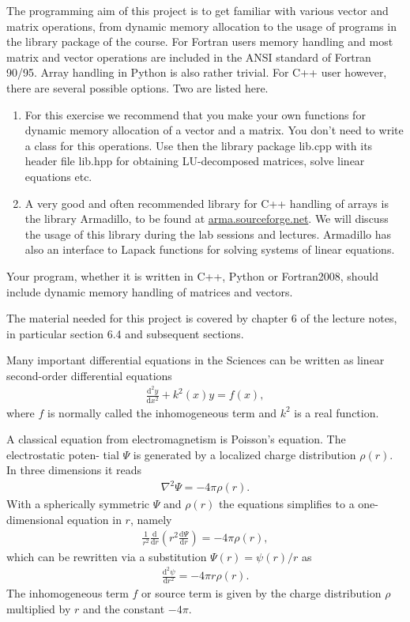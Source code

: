 \documentclass[11pt,a4wide]{article}
\newcommand{\der} [2]{\frac{\mathrm{d} #1}{\mathrm{d} #2}}   %
\begin{document}
The programming aim of this project is to get familiar with various vector and matrix operations,
from dynamic memory allocation to the usage of programs in the library
package of the course. 
For Fortran users memory handling and most matrix and vector operations
are included in the ANSI standard of Fortran 90/95. Array handling in Python is also rather trivial. For C++ user however,
there are several possible options. Two are listed here.
\begin{enumerate}
\item For this exercise we recommend that you make your own functions for dynamic memory allocation of a 
vector and a matrix. You don't need to write a class for this operations. 
Use then the 
library package lib.cpp with its header file 
lib.hpp for obtaining LU-decomposed matrices, solve linear equations
etc.
\item A very good and often recommended library for C++ handling of arrays is the library Armadillo, to be found at \url{arma.sourceforge.net}.  We will discuss the usage of this library during the lab sessions and lectures. Armadillo has also an interface to Lapack functions for solving systems of linear equations.
\end{enumerate}

Your program, whether it is written in C++, Python 
or Fortran2008, should include
dynamic memory handling of matrices and vectors. 

The material needed for this project is covered by chapter 6 of the lecture notes, in particular section 6.4 and subsequent sections.

Many important differential equations in the Sciences can be written as linear second-order differential equations
\begin{align}
\der{^2 y}{x^2} + k^2(x) y = f(x),
\end{align}
where $f$ is normally called the inhomogeneous term and $k^2$ is a real function.

A classical equation from electromagnetism is Poisson’s equation. The electrostatic poten-
tial $\Psi$ is generated by a localized charge distribution $\rho(r)$. In three dimensions it reads
\begin{align}
\nabla^2 \Psi = -4\pi \rho(r).
\end{align}
With a spherically symmetric $\Psi$ and $\rho(r)$ the equations simplifies to a one-dimensional equation in $r$, namely
\begin{align}
\frac{1}{r^2}\der{}{r} \left(r^2 \der{\Psi}{r} \right) = -4\pi \rho(r),
\end{align}
which can be rewritten via a substitution $\Psi(r) = \psi(r)/r$ as
\begin{align}
\der{^2\psi}{r^2} = -4\pi r \rho(r).
\end{align}
The inhomogeneous term $f$ or source term is given by the charge distribution $\rho$ multiplied by $r$ and the constant $−4\pi$.
\end{document}
